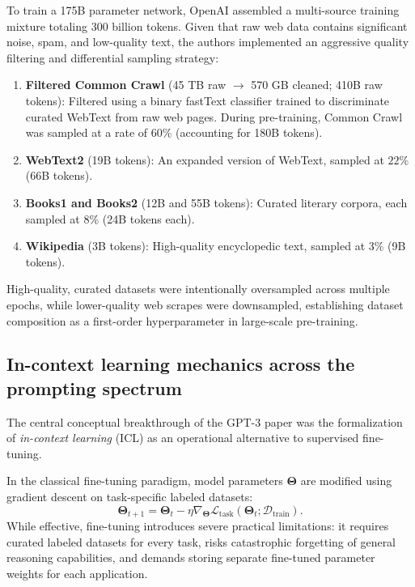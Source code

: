 \documentclass[../../main.tex]{subfiles}
\begin{document}
To train a 175B parameter network, OpenAI assembled a multi-source training mixture totaling 300 billion tokens. Given that raw web data contains significant noise, spam, and low-quality text, the authors implemented an aggressive quality filtering and differential sampling strategy:
\begin{enumerate}
    \item \textbf{Filtered Common Crawl} (45 TB raw $\to$ 570 GB cleaned; 410B raw tokens): Filtered using a binary fastText classifier trained to discriminate curated WebText from raw web pages. During pre-training, Common Crawl was sampled at a rate of $60\%$ (accounting for 180B tokens).
    \item \textbf{WebText2} (19B tokens): An expanded version of WebText, sampled at $22\%$ (66B tokens).
    \item \textbf{Books1 and Books2} (12B and 55B tokens): Curated literary corpora, each sampled at $8\%$ (24B tokens each).
    \item \textbf{Wikipedia} (3B tokens): High-quality encyclopedic text, sampled at $3\%$ (9B tokens).
\end{enumerate}
High-quality, curated datasets were intentionally oversampled across multiple epochs, while lower-quality web scrapes were downsampled, establishing dataset composition as a first-order hyperparameter in large-scale pre-training.


\subsection{In-context learning mechanics across the prompting spectrum}
\label{subsec:gpt3_icl_mechanics}

The central conceptual breakthrough of the GPT-3 paper was the formalization of \emph{in-context learning} (ICL) as an operational alternative to supervised fine-tuning.

In the classical fine-tuning paradigm, model parameters $\boldsymbol{\Theta}$ are modified using gradient descent on task-specific labeled datasets:
\begin{equation}
\boldsymbol{\Theta}_{t+1} = \boldsymbol{\Theta}_t - \eta \nabla_{\boldsymbol{\Theta}} \mathcal{L}_{\text{task}}(\boldsymbol{\Theta}_t; \mathcal{D}_{\text{train}}).
\label{eq:finetuning_update}
\end{equation}
While effective, fine-tuning introduces severe practical limitations: it requires curated labeled datasets for every task, risks catastrophic forgetting of general reasoning capabilities, and demands storing separate fine-tuned parameter weights for each application.
\end{document}
